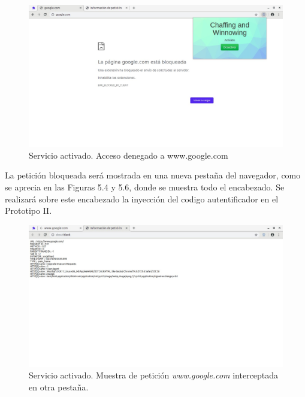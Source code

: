 \documentclass[12pt, a4paper, titlepage]{report}
\begin{document}
        	\begin{figure}[H]
        		\begin{center}	\includegraphics[width=13cm]{./imagenes/Pruebas/Prototipo_1/P_activado1.jpeg}
        			\caption{Servicio activado. Acceso denegado a www.google.com}
        		\end{center}
        	\end{figure}
        	
        	La petición bloqueada será mostrada en una nueva pestaña del navegador, como se aprecia en las Figuras 5.4 y 5.6, donde se muestra todo el encabezado. Se realizará sobre este encabezado la inyección del codigo autentificador en el Prototipo II.
        	
        	\begin{figure}[H]
        		\begin{center}	\includegraphics[width=13cm]{./imagenes/Pruebas/Prototipo_1/P_activado1_mostrarPeticion.jpeg}
        			\caption[Servicio activado. Muestra de petición \textit{www.google.com}]{Servicio activado. Muestra de petición \textit{www.google.com} interceptada en otra pestaña.}
        		\end{center}
        	\end{figure}
        	
\end{document}
